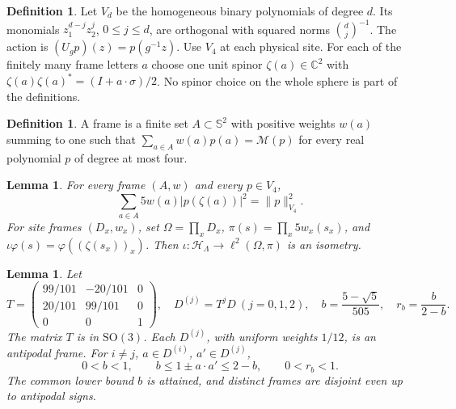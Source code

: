 \documentclass[11pt,reqno]{amsart}
\newtheorem{lemma}[theorem]{Lemma}
\theoremstyle{definition}
\newtheorem{definition}[theorem]{Definition}
\theoremstyle{remark}
\begin{document}
\begin{definition}\label{d:poly}
Let \(V_d\) be the homogeneous binary polynomials of degree \(d\).
Its monomials \(z_1^{d-j}z_2^j\), \(0\le j\le d\), are orthogonal with
squared norms \(\binom dj^{-1}\). The action is
\((U_gp)(z)=p(g^{-1}z)\). Use \(V_4\) at each physical site.
For each of the finitely many frame letters \(a\) choose one unit
spinor \(\zeta(a)\in\mathbb C^2\) with
\(\zeta(a)\zeta(a)^*=(I+a\cdot\sigma)/2\).
No spinor choice on the whole sphere is part of the definitions.
\end{definition}

\begin{definition}\label{d:frame}
A frame is a finite set \(A\subset\mathbb S^2\) with positive weights
\(w(a)\) summing to one such that
\(\sum_{a\in A}w(a)p(a)=\mathcal M(p)\)
for every real polynomial \(p\) of degree at most four.
\end{definition}

\begin{lemma}\label{l:tight}
For every frame \((A,w)\) and every \(p\in V_4\),
\[
 \sum_{a\in A}5w(a)|p(\zeta(a))|^2=\|p\|_{V_4}^2.
\]
For site frames \((D_x,w_x)\), set \(\Omega=\prod_xD_x\),
\(\pi(s)=\prod_x5w_x(s_x)\), and
\(\iota\varphi(s)=\varphi((\zeta(s_x))_x)\).
Then \(\iota:\mathcal H_\Lambda\to\ell^2(\Omega,\pi)\) is an isometry.
\end{lemma}

\begin{lemma}\label{l:threeframes}
Let
\[
 T=\begin{pmatrix}99/101&-20/101&0\\20/101&99/101&0\\0&0&1\end{pmatrix},
 \quad D^{(j)}=T^jD\ (j=0,1,2),\quad
 b=\frac{5-\sqrt5}{505},\quad r_b=\frac b{2-b}.
\]
The matrix \(T\) is in \(\mathrm{SO}(3)\).
Each \(D^{(j)}\), with uniform weights \(1/12\), is an antipodal frame.
For \(i\ne j\), \(a\in D^{(i)}\), \(a'\in D^{(j)}\),
\[
 0<b<1,\qquad b\le1\pm a\cdot a'\le2-b,\qquad0<r_b<1.
\]
The common lower bound \(b\) is attained, and distinct frames are
disjoint even up to antipodal signs.
\end{lemma}
\end{document}
